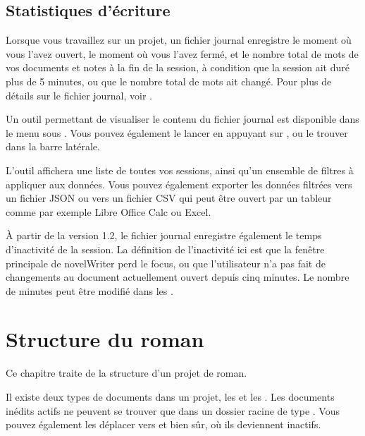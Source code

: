 \documentclass[a4paper,11pt,french]{sphinxmanual}
\begin{document}
\section{Statistiques d’écriture}
\label{\detokenize{project_overview:writing-statistics}}\label{\detokenize{project_overview:a-proj-stats}}
\sphinxAtStartPar
Lorsque vous travaillez sur un projet, un fichier journal enregistre le moment où vous l’avez ouvert, le moment où vous l’avez fermé, et le nombre total de mots de vos documents et notes à la fin de la session, à condition que la session ait duré plus de 5 minutes, ou que le nombre total de mots ait changé. Pour plus de détails sur le fichier journal, voir {\hyperref[\detokenize{tech_storage:a-storage}]{}}.

\sphinxAtStartPar
Un outil permettant de visualiser le contenu du fichier journal est disponible dans le menu  sous . Vous pouvez également le lancer en appuyant sur , ou le trouver dans la barre latérale.

\sphinxAtStartPar
L’outil affichera une liste de toutes vos sessions, ainsi qu’un ensemble de filtres à appliquer aux données. Vous pouvez également exporter les données filtrées vers un fichier JSON ou vers un fichier CSV qui peut être ouvert par un tableur comme par exemple Libre Office Calc ou Excel.

\sphinxAtStartPar
{}À partir de la version 1.2, le fichier journal enregistre également le temps d’inactivité de la session. La définition de l’inactivité ici est que la fenêtre principale de novelWriter perd le focus, ou que l’utilisateur n’a pas fait de changements au document actuellement ouvert depuis cinq minutes. Le nombre de minutes peut être modifié dans les .

\sphinxstepscope


\chapter{Structure du roman}
\label{\detokenize{project_structure:novel-structure}}\label{\detokenize{project_structure:a-struct}}\label{\detokenize{project_structure::doc}}
\sphinxAtStartPar
Ce chapitre traite de la structure d’un projet de roman.

\sphinxAtStartPar
Il existe deux types de documents dans un projet, les  et les . Les documents inédits actifs ne peuvent se trouver que dans un dossier racine de type . Vous pouvez également les déplacer vers  et  bien sûr, où ils deviennent inactifs.
\end{document}
